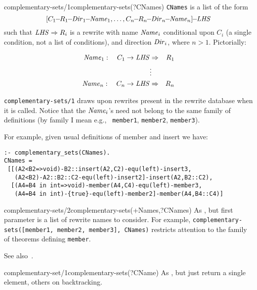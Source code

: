 \begin{predicate}{complementary-sets/1}{complementary-sets(?CNames)}%
{\tt CNames} is a list of the form
\[\def\m{\!\!-\!\!}
[C_1\m R_1\m {\it Dir}_1\m {\it Name}_1, \ldots, C_n\m R_n\m {\it Dir}_n\m {\it Name}_n]\m {\it LHS}
\]
such that ${\it LHS} \Rightarrow R_i$ is a rewrite with name ${\it
Name}_i$ conditional upon $C_i$ (a single condition, not a list of
conditions), and direction ${\it Dir}_i$, where $n>1$.  Pictorially:

\begin{eqnarray*}
   {\it Name}_1:\quad C_1 \rightarrow {\it LHS} &\Rightarrow& R_1\\
                        & \vdots \\
   {\it Name}_n:\quad C_n \rightarrow {\it LHS} &\Rightarrow& R_n
\end{eqnarray*}

{\tt complementary-sets/1} draws upon rewrites present in the rewrite
database when it is called.  Notice that the ${\it Name}_i$'s need not
belong to the same family of definitions (by family I mean e.g., {\tt
member1}, {\tt member2}, {\tt member3}).

For example, given usual definitions of member and insert we have:

{\small\begin{verbatim}
:- complementary_sets(CNames).
CNames = 
 [[(A2<B2=>void)-B2::insert(A2,C2)-equ(left)-insert3,
   (A2<B2)-A2::B2::C2-equ(left)-insert2]-insert(A2,B2::C2),
  [(A4=B4 in int=>void)-member(A4,C4)-equ(left)-member3,
   (A4=B4 in int)-{true}-equ(left)-member2]-member(A4,B4::C4)]
\end{verbatim}
}
\end{predicate}


\begin{predicate}{complementary-sets/2}{complementary-sets(+Names,?CNames)}%
As , but first parameter is a list of rewrite
names to consider.  For example, {\tt complementary-sets([member1, member2,
member3], CNames)} restricts attention to the  family of
theorems defining {\tt member}. 

See also~.
\end{predicate}

\begin{predicate}{complementary-set/1}{complementary-sets(?CName)}%
As , but just return a single element, others
on backtracking.
\end{predicate}

